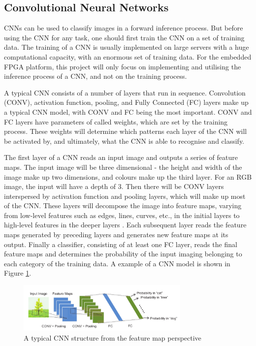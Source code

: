 \documentclass[12pt]{article}
\begin{document}
\subsection{Convolutional Neural Networks}
\label{sec:Background-CNN}
\vspace{-12pt}

CNNs can be used to classify images in a forward inference process. But before using the CNN for any task, one should first train the CNN on a set of training data. The training of a CNN is usually implemented on large servers with a huge computational capacity, with an enormous set of training data. For the embedded FPGA platform, this project will only focus on implementing and utilising the inference process of a CNN, and not on the training process.

A typical CNN consists of a number of layers that run in sequence. Convolution (CONV), activation function, pooling, and Fully Connected (FC) layers make up a typical CNN model, with CONV and FC being the most important. CONV and FC layers have parameters of called weights, which are set by the training process. These weights will determine which patterns each layer of the CNN will be activated by, and ultimately, what the CNN is able to recognise and classify. 

The first layer of a CNN reads an input image and outputs a series of feature maps. The input image will be three dimensional - the height and width of the image make up two dimensions, and colours make up the third layer. For an RGB image, the input will have a depth of 3. Then there will be CONV layers interspersed by activation function and pooling layers, which will make up most of the CNN. These layers will decompose the image into feature maps, varying from low-level features such as edges, lines, curves, etc., in the initial layers to high-level features in the deeper layers \cite{SudaFpgaAccelerator}. Each subsequent layer reads the feature maps generated by preceding layers and generates new feature maps at its output. Finally a classifier, consisting of at least one FC layer, reads the final feature maps and determines the probability of the input imaging belonging to each category of the training data. A example of a CNN model is shown in Figure \ref{fig:typicalCNN}.
\begin{figure}[h]
\centering
\includegraphics[width=0.75\textwidth]{../figures/typicalCnn}
\caption{A typical CNN structure from the feature map perspective \cite{embeddedFpgaCnn} \label{fig:typicalCNN}}
\end{figure}
\vspace{-12pt}
\end{document}
